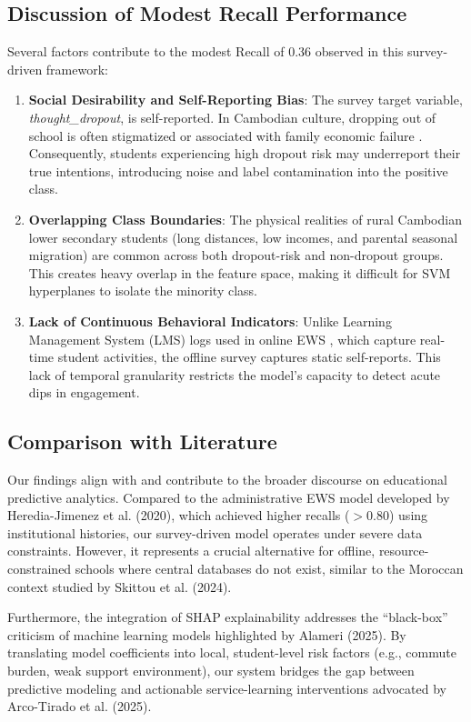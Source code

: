 \documentclass[12pt,journal,compsoc]{IEEEtran}
\begin{document}
\subsection{Discussion of Modest Recall Performance}
\label{subsec:recall_discussion}
Several factors contribute to the modest Recall of 0.36 observed in this survey-driven framework:
\begin{enumerate}
    \item \textbf{Social Desirability and Self-Reporting Bias}: The survey target variable, \textit{thought\_dropout}, is self-reported. In Cambodian culture, dropping out of school is often stigmatized or associated with family economic failure \cite{kreng2016school}. Consequently, students experiencing high dropout risk may underreport their true intentions, introducing noise and label contamination into the positive class.
    \item \textbf{Overlapping Class Boundaries}: The physical realities of rural Cambodian lower secondary students (long distances, low incomes, and parental seasonal migration) are common across both dropout-risk and non-dropout groups. This creates heavy overlap in the feature space, making it difficult for SVM hyperplanes to isolate the minority class.
    \item \textbf{Lack of Continuous Behavioral Indicators}: Unlike Learning Management System (LMS) logs used in online EWS \cite{marcolino2025catboost}, which capture real-time student activities, the offline survey captures static self-reports. This lack of temporal granularity restricts the model's capacity to detect acute dips in engagement.
\end{enumerate}

\subsection{Comparison with Literature}
\label{subsec:literature_comparison}
Our findings align with and contribute to the broader discourse on educational predictive analytics. Compared to the administrative EWS model developed by Heredia-Jimenez et al. (2020), which achieved higher recalls ($>0.80$) using institutional histories, our survey-driven model operates under severe data constraints. However, it represents a crucial alternative for offline, resource-constrained schools where central databases do not exist, similar to the Moroccan context studied by Skittou et al. (2024).

Furthermore, the integration of SHAP explainability addresses the ``black-box'' criticism of machine learning models highlighted by Alameri (2025). By translating model coefficients into local, student-level risk factors (e.g., commute burden, weak support environment), our system bridges the gap between predictive modeling and actionable service-learning interventions advocated by Arco-Tirado et al. (2025).
\end{document}
